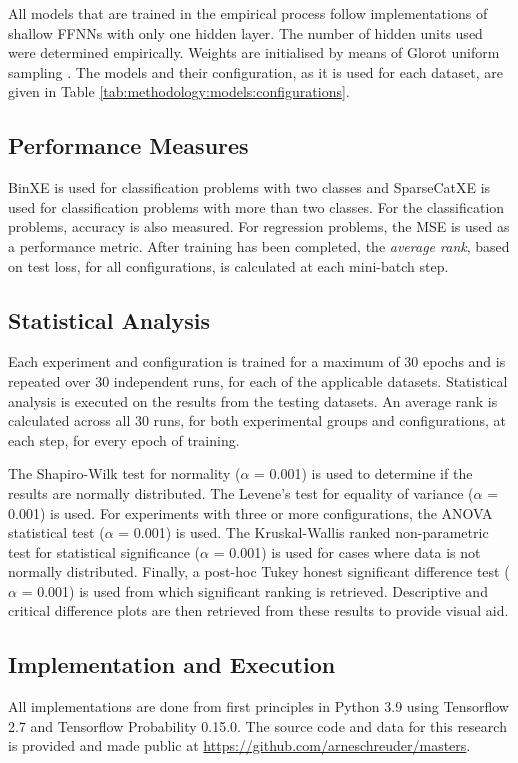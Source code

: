 All models that are trained in the empirical process follow implementations of shallow \acp{FFNN} with only one hidden layer. The number of hidden units used were determined empirically. Weights are initialised by means of Glorot uniform sampling \cite{ref:glorot:2010}. The models and their configuration, as it is used for each dataset, are given in Table \ref{tab:methodology:models:configurations}.

\subsection{Performance Measures}\label{sec:methodology:performance_measures}

\acs{BinXE} is used for classification problems with two classes and \acs{SparseCatXE} is used for classification problems with more than two classes. For the classification problems, accuracy is also measured. For regression problems, the \acs{MSE} is used as a performance metric. After training has been completed, the \textit{average rank}, based on test loss, for all configurations, is calculated at each mini-batch step.


\subsection{Statistical Analysis}
\label{sec:methodology:statistical_analysis}

Each experiment and configuration is trained for a maximum of 30 epochs and is repeated over 30 independent runs, for each of the applicable datasets. Statistical analysis is executed on the results from the testing datasets. An average rank is calculated across all 30 runs, for both experimental groups and configurations, at each step, for every epoch of training.

The Shapiro-Wilk test for normality \cite{ref:shapiro:1965} ($\alpha$ = 0.001) is used to determine if the results are normally distributed. The Levene's test for equality of variance \cite{ref:levene:1961} ($\alpha$ = 0.001) is used. For experiments with three or more configurations, the \acs{ANOVA} statistical test \cite{ref:fisher:1921} ($\alpha$ = 0.001) is used. The Kruskal-Wallis ranked non-parametric test \cite{ref:kruskal:1952} for statistical significance ($\alpha$ = 0.001) is used for cases where data is not normally distributed. Finally, a post-hoc Tukey honest significant difference test \cite{ref:tukey:1949} ($\alpha$ = 0.001) is used from which significant ranking is retrieved. Descriptive and critical difference plots are then retrieved from these results to provide visual aid.

\subsection{Implementation and Execution}\label{sec:methodology:implementation}

All implementations are done from first principles in Python 3.9 using Tensorflow 2.7 and Tensorflow Probability 0.15.0. The source code and data for this research is provided and made public at \url{https://github.com/arneschreuder/masters}.